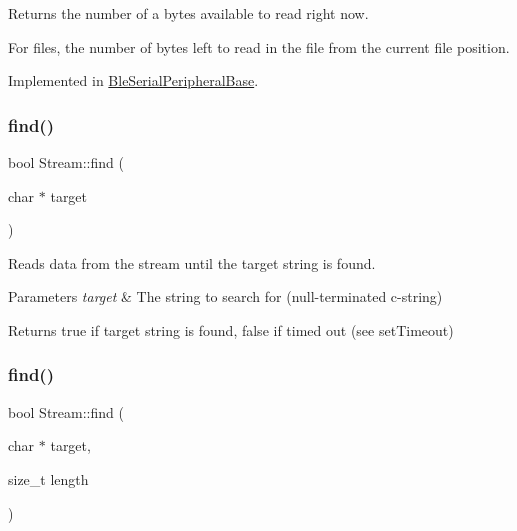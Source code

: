 Returns the number of a bytes available to read right now. 

For files, the number of bytes left to read in the file from the current file position. 

Implemented in \mbox{\hyperlink{class_ble_serial_peripheral_base_a946cc56677f03db99de9409851427941}{Ble\+Serial\+Peripheral\+Base}}.

\mbox{\label{class_stream_a4bab30ccd324efd461dee46a2339f673}} 
\subsubsection{\texorpdfstring{find()}{find()}\hspace{0.1cm}{\footnotesize\ttfamily [1/2]}}
{\footnotesize\ttfamily bool Stream\+::find (\begin{DoxyParamCaption}\item[{char $\ast$}]{target }\end{DoxyParamCaption})}



Reads data from the stream until the target string is found. 


\begin{DoxyParams}{Parameters}
{\em target} & The string to search for (null-\/terminated c-\/string)\\
\hline
\end{DoxyParams}
\begin{DoxyReturn}{Returns}
true if target string is found, false if timed out (see set\+Timeout) 
\end{DoxyReturn}
\mbox{\label{class_stream_ad851401f2318cdb1de05707e021b81d9}} 
\subsubsection{\texorpdfstring{find()}{find()}\hspace{0.1cm}{\footnotesize\ttfamily [2/2]}}
{\footnotesize\ttfamily bool Stream\+::find (\begin{DoxyParamCaption}\item[{char $\ast$}]{target,  }\item[{size\+\_\+t}]{length }\end{DoxyParamCaption})}



